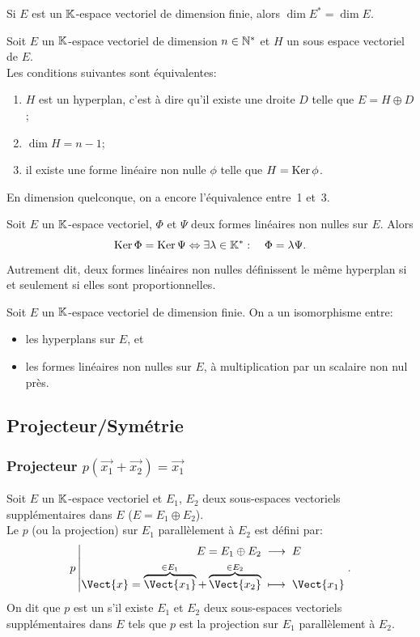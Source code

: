 \documentclass{book}
\begin{document}
\begin{Proposition}[Dimension]
Si $E$ est un $\mathbb{K}$-espace vectoriel de dimension finie, alors $\dim E^* = \dim E$.
\end{Proposition}

\begin{Theoreme}
Soit $E$ un $\mathbb{K}$-espace vectoriel de dimension $n\in\mathbb{N}^*$ et $H$ un sous espace vectoriel de $E$.\\
Les conditions suivantes sont équivalentes:
\begin{enumerate}
\item $H$ est un hyperplan, c'est à dire qu'il existe une droite $D$ telle que $E = H \oplus D$;
\item $\dim H = n - 1$;
\item il existe une forme linéaire non nulle $\phi$ telle que $H = \operatorname{Ker} \phi$.
\end{enumerate}
\end{Theoreme}
\begin{Remarque}
En dimension quelconque, on a encore l'équivalence entre~1 et~3.
\end{Remarque}


\begin{Proposition}
Soit $E$ un $\mathbb{K} $-espace vectoriel, $\Phi $ et $\Psi $ deux formes linéaires non nulles sur $E$.
Alors \[ \operatorname{Ker} \Phi  = \operatorname{Ker} \Psi  \Leftrightarrow \exists  \lambda \in  \mathbb{K}^*:\quad \Phi  = \lambda \Psi . \]
Autrement dit, deux formes linéaires non nulles définissent le même hyperplan si et seulement si elles sont proportionnelles.
\end{Proposition}
\begin{Remarque}
Soit $E$ un $\mathbb{K} $-espace vectoriel de dimension finie.  On a un isomorphisme entre:
\begin{itemize}
\item les hyperplans sur $E$, et
\item les formes linéaires non nulles sur $E$, à multiplication par un scalaire non nul près.
\end{itemize}
\end{Remarque}

\subsection{Projecteur/Symétrie}
\subsubsection{Projecteur $p(\vec{x_1} + \vec{x_2})=\vec{x_1}$}
\begin{Definition}[Projecteur]
 Soit $E$ un $\mathbb{K} $-espace vectoriel et $E_1$, $E_2$ deux sous-espaces vectoriels supplémentaires dans $E$  ($E = E_1 \oplus E_2$).\\
Le  $p$ (ou la projection) sur $E_1$ parallèlement à $E_2$ est défini par:
$$\Fonction{p}{ E = E_1 \oplus E_2 }{ E}{\Vect{x} = \overbrace{\Vect{x_1}}^{\in E_1} + \overbrace{\Vect{x_2}}^{\in E_2}}{\Vect{x_1}}.$$
On dit que $p$ est un  s'il existe $E_1$ et $E_2$ deux sous-espaces vectoriels supplémentaires dans $E$ tels que
$p$ est la projection sur $E_1$ parallèlement à $E_2$.
\end{Definition}
\end{document}

